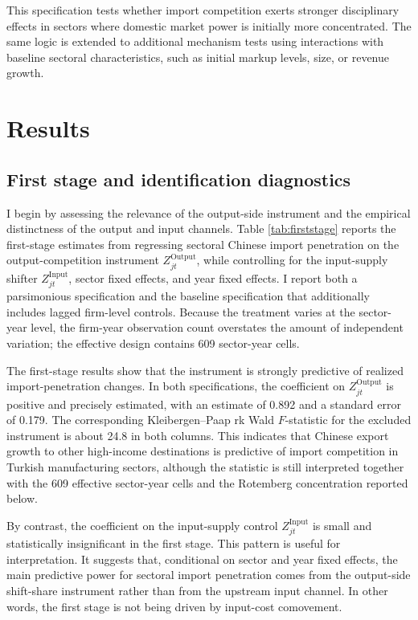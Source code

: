﻿\documentclass[12pt]{article}
\begin{document}
This specification tests whether import competition exerts stronger disciplinary effects in sectors where domestic market power is initially more concentrated. The same logic is extended to additional mechanism tests using interactions with baseline sectoral characteristics, such as initial markup levels, size, or revenue growth.

\section{Results}

\subsection{First stage and identification diagnostics}

I begin by assessing the relevance of the output-side instrument and the empirical distinctness of the output and input channels. Table \ref{tab:firststage} reports the first-stage estimates from regressing sectoral Chinese import penetration on the output-competition instrument \(Z^{\text{Output}}_{jt}\), while controlling for the input-supply shifter \(Z^{\text{Input}}_{jt}\), sector fixed effects, and year fixed effects. I report both a parsimonious specification and the baseline specification that additionally includes lagged firm-level controls. Because the treatment varies at the sector-year level, the firm-year observation count overstates the amount of independent variation; the effective design contains 609 sector-year cells.

The first-stage results show that the instrument is strongly predictive of realized import-penetration changes. In both specifications, the coefficient on \(Z^{\text{Output}}_{jt}\) is positive and precisely estimated, with an estimate of 0.892 and a standard error of 0.179. The corresponding Kleibergen--Paap rk Wald \(F\)-statistic for the excluded instrument is about 24.8 in both columns. This indicates that Chinese export growth to other high-income destinations is predictive of import competition in Turkish manufacturing sectors, although the statistic is still interpreted together with the 609 effective sector-year cells and the Rotemberg concentration reported below.

By contrast, the coefficient on the input-supply control \(Z^{\text{Input}}_{jt}\) is small and statistically insignificant in the first stage. This pattern is useful for interpretation. It suggests that, conditional on sector and year fixed effects, the main predictive power for sectoral import penetration comes from the output-side shift-share instrument rather than from the upstream input channel. In other words, the first stage is not being driven by input-cost comovement.
\end{document}
